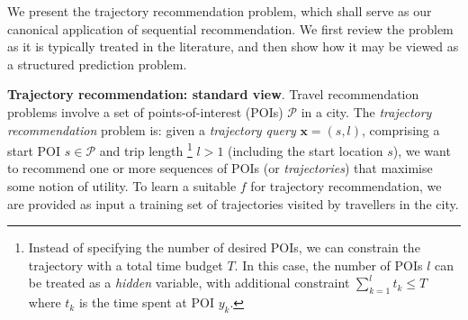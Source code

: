 

We present the trajectory recommendation problem,
which shall serve as our canonical application of sequential recommendation.
We first review the problem as it is typically treated in the literature,
and then show how it may be viewed as a structured prediction problem.

\textbf{Trajectory recommendation: standard view}.
Travel recommendation problems involve a set of points-of-interest (POIs) $\mathcal{P}$ in a city.
The \emph{trajectory recommendation} problem is: given a \emph{trajectory query} $\mathbf{x} = (s, l)$,
comprising a start POI $s \in \mathcal{P}$ and trip length
\footnote{Instead of specifying the number of desired POIs, 
we can constrain the trajectory with a total time budget $T$. 
In this case, the number of POIs $l$ can be treated as a \emph{hidden} variable, 
with additional constraint $\sum_{k=1}^l t_k \le T$ where $t_k$ is the time spent at POI $y_k$.}
$l > 1$ (including the start location $s$),
we want to recommend one or more sequences of POIs (or \emph{trajectories}) %
that maximise some notion of utility.
To learn a suitable $f$ for trajectory recommendation,
we are provided as input a training set
of trajectories visited by travellers in the city.

%

